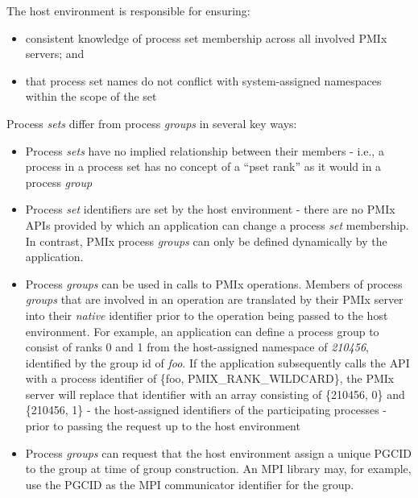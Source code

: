 \advicermstart
The host environment is responsible for ensuring:

\begin{itemize}
    \item consistent knowledge of process set membership across all involved
    \ac{PMIx} servers; and
    \item that process set names do not conflict with system-assigned namespaces within the scope of the set
\end{itemize}

\advicermend

Process \emph{sets} differ from process \emph{groups} in several key ways:

\begin{itemize}
    \item Process \emph{sets} have no implied relationship between their members - i.e., a process in a process set has no concept of a ``pset rank'' as it would in a process \emph{group}

    \item Process \emph{set} identifiers are set by the host environment -
    there are no \ac{PMIx} \acp{API} provided by which an application can
    change a process \emph{set} membership. In contrast, \ac{PMIx} process
    \emph{groups} can only be defined dynamically by the application.

    \item Process \emph{groups} can be used in calls to \ac{PMIx} operations. Members of process \emph{groups} that are involved in an operation are translated by their \ac{PMIx} server into their \emph{native} identifier prior to the operation being passed to the host environment. For example, an application can define a process group to consist of ranks 0 and 1 from the host-assigned namespace of \emph{210456}, identified by the group id of \emph{foo}. If the application subsequently calls the  \ac{API} with a process identifier of \{foo, PMIX_RANK_WILDCARD\}, the \ac{PMIx} server will replace that identifier with an array consisting of \{210456, 0\} and \{210456, 1\} - the host-assigned identifiers of the participating processes - prior to passing the request up to the host environment

    \item Process \emph{groups} can request that the host environment assign a unique  \ac{PGCID} to the group at time of group construction. An \ac{MPI} library may, for example, use the \ac{PGCID} as the \ac{MPI} communicator identifier for the group.
\end{itemize}

